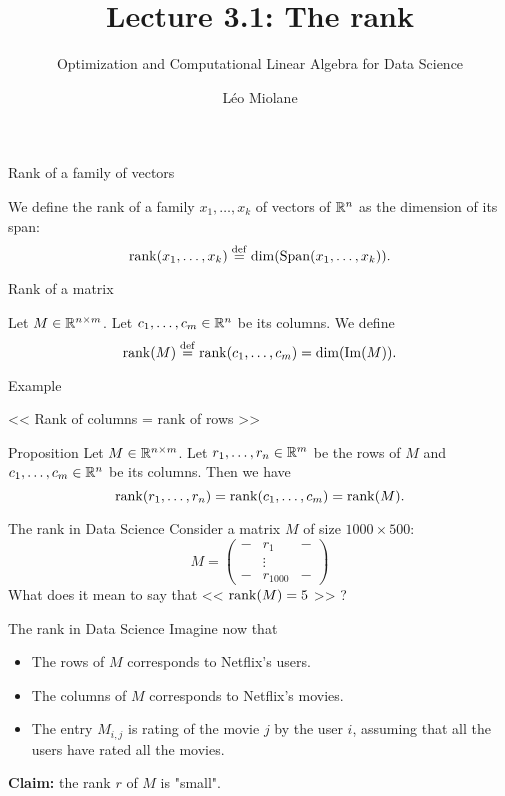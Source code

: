 \documentclass{beamer}
\title{Lecture 3.1: The rank}
\subtitle{Optimization and Computational Linear Algebra for Data Science}
\author{Léo Miolane}
\date{}
\begin{document}
\setcounter{showProgressBar}{0}
\setcounter{showSlideNumbers}{0}

\frame{\titlepage}


\setcounter{framenumber}{0}
\setcounter{showSlideNumbers}{1}


\begin{frame}[t]{Rank of a family of vectors}
	\begin{definition}
		We define the rank of a family $x_1, \dots, x_k$ of vectors of $\mathbb{R}^n$ as the dimension of its span:
		$$
		{{\rm rank}}(x_1, \dots, x_k) \overset{\rm def}{=} {{\rm dim}} ({{\rm Span}}(x_1, \dots, x_k)).
		$$
	\end{definition}
\end{frame}

\begin{frame}[t]{Rank of a matrix}
	\begin{definition}
		Let $M \in \mathbb{R}^{n \times m}$. Let $c_1, \dots, c_m \in \mathbb{R}^n$ be its columns.
		We define
		$$
		{{\rm rank}}(M) \overset{\rm def}{=} {{\rm rank}}(c_1, \dots, c_m) = {{\rm dim}}({{\rm Im}}(M)).
		$$
	\end{definition}
\end{frame}

\begin{frame}{Example}
\end{frame}

\begin{frame}[t]{<< Rank of columns = rank of rows >>}
	\begin{block}{Proposition}
		Let $M \in \mathbb{R}^{n \times m}$. Let $r_1, \dots, r_n \in \mathbb{R}^m$ be the rows of $M$ and $c_1, \dots, c_m \in \mathbb{R}^n$ be its columns.
		Then we have
		$$
		{{\rm rank}}(r_1, \dots, r_n) = {{\rm rank}}(c_1, \dots, c_m) = {{\rm rank}}(M).
		$$
	\end{block}
\end{frame}

\begin{frame}[t]{The rank in Data Science}
	\vspace{-0.3cm}
	Consider a matrix $M$ of size $1000 \times 500$:
	$$
	M=
	\begin{pmatrix}
		- & r_1 & - \\
		  & \vdots & \\
		-  & r_{1000} & -
	\end{pmatrix}
	$$
	What does it mean to say that << ${{\rm rank}}(M)=5$ >> ?
\end{frame}
\begin{frame}[t]{The rank in Data Science}
	Imagine now that
	\begin{itemize}
		\item The rows of $M$ corresponds to Netflix's users.
		\item The columns of $M$ corresponds to Netflix's movies.
		\item The entry $M_{i,j}$ is rating of the movie $j$ by the user $i$, assuming that all the users have rated all the movies.
	\end{itemize}
	\vspace{0.3cm}
	\textbf{Claim:} the rank $r$ of $M$ is "small".
\end{frame}
\end{document}
